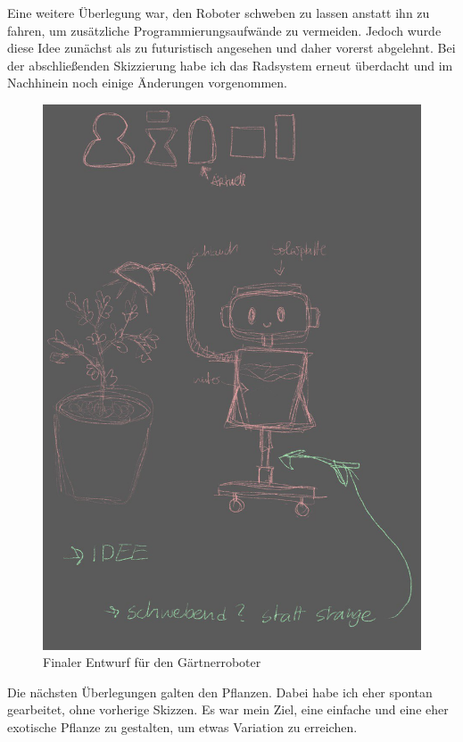 \par
Eine weitere Überlegung war, den Roboter schweben zu lassen anstatt ihn zu fahren, um zusätzliche Programmierungsaufwände zu vermeiden. Jedoch wurde diese Idee zunächst als zu futuristisch angesehen und daher vorerst abgelehnt. Bei der abschließenden Skizzierung habe ich das Radsystem erneut überdacht und im Nachhinein noch einige Änderungen vorgenommen.
\begin{figure}[H]
	\centering
	\includegraphics[height=0.3\pageheight,keepaspectratio]{pics/2} 
	\caption{Finaler Entwurf für den Gärtnerroboter}
\end{figure}
\par
Die nächsten Überlegungen galten den Pflanzen. Dabei habe ich eher spontan gearbeitet, ohne vorherige Skizzen. Es war mein Ziel, eine einfache und eine eher exotische Pflanze zu gestalten, um etwas Variation zu erreichen.
